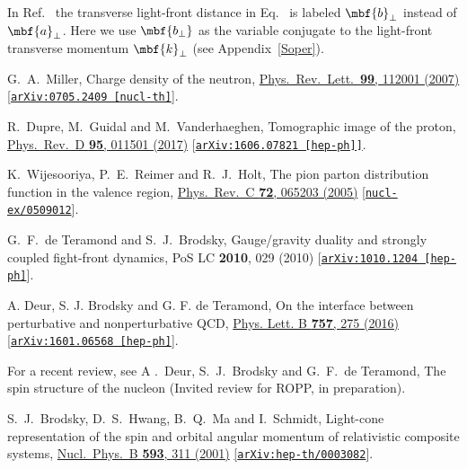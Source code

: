 \documentclass[aps,prd,preprint,groupedaddress]{revtex4-1}
\begin{document}
\begin{thebibliography}{99}
 
In Ref.~\cite{Burkardt:2000za} the transverse light-front distance in Eq.~ is labeled $\mbf{b}_\perp$ instead of $\mbf{a}_\perp$. Here we use $\mbf{b_\perp}$ as the variable conjugate to the light-front transverse momentum $\mbf{k}_\perp$ (see Appendix~\ref{Soper}).


  G.~A.~Miller,
  Charge density of the neutron,
  \href{https://journals.aps.org/prl/abstract/10.1103/PhysRevLett.99.112001}{Phys.\ Rev.\ Lett.\  {\bf 99}, 112001 (2007)}
  [\href{https://arxiv.org/abs/0705.2409}{\tt arXiv:0705.2409 [nucl-th]}].
  
  
  R.~Dupre, M.~Guidal and M.~Vanderhaeghen,
  Tomographic image of the proton,
  \href{https://journals.aps.org/prd/abstract/10.1103/PhysRevD.95.011501}{Phys.\ Rev.\ D {\bf 95}, 011501 (2017)}
  [\href{https://arxiv.org/abs/1606.07821}{\tt arXiv:1606.07821 [hep-ph]]}.



 K.~Wijesooriya, P.~E.~Reimer and R.~J.~Holt,
  The pion parton distribution function in the valence region,
  \href{https://journals.aps.org/prc/abstract/10.1103/PhysRevC.72.065203}{Phys.\ Rev.\ C {\bf 72}, 065203 (2005)}
  [\href{https://arxiv.org/abs/nucl-ex/0509012}{\tt nucl-ex/0509012}]. 
  
  
  G.~F.~de Teramond and S.~J.~Brodsky,
  Gauge/gravity duality and strongly coupled fight-front dynamics,
  PoS LC {\bf 2010}, 029 (2010)
  [\href{https://arxiv.org/abs/1010.1204}{\tt arXiv:1010.1204 [hep-ph]}].   
    
  
A. Deur, S. J. Brodsky and G. F. de Teramond, 
On the interface between perturbative and nonperturbative QCD,
\href{http://www.sciencedirect.com/science/article/pii/S037026931630048X}{Phys. Lett. B {\bf 757}, 275 (2016)} 
[\href{https://arxiv.org/abs/1601.06568}{\tt arXiv:1601.06568 [hep-ph]}].
    

 For a recent review, see
 A .~Deur, S.~J.~Brodsky and G.~F.~de Teramond,  The spin structure of the nucleon (Invited review for ROPP, in preparation).
 
 
  S.~J.~Brodsky, D.~S.~Hwang, B.~Q.~Ma and I.~Schmidt,
  Light-cone representation of the spin and orbital angular momentum of relativistic composite systems,
  \href{http://www.sciencedirect.com/science/article/pii/S055032130000626X?via%3Dihub}{Nucl.\ Phys.\ B {\bf 593}, 311 (2001)}
  \href{https://arxiv.org/abs/hep-th/0003082}{[\tt arXiv:hep-th/0003082}]. 
  


\end{thebibliography}
\end{document}
